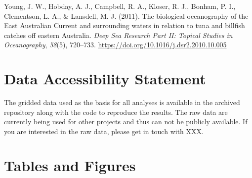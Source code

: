 \documentclass{article}
\newlength{\cslhangindent}
\newlength{\cslentryspacingunit} %
\newenvironment{CSLReferences}[2] %
 {%
  \setlength{\parindent}{0pt}
  \ifodd #1
  \let\oldpar\par
  \def\par{\hangindent=\cslhangindent\oldpar}
  \fi
  \setlength{\parskip}{#2\cslentryspacingunit}
 }%
 {}
\begin{document}
\begin{CSLReferences}{1}{0}
\leavevmode{}%
Young, J. W., Hobday, A. J., Campbell, R. A., Kloser, R. J., Bonham, P. I., Clementson, L. A., \& Lansdell, M. J. (2011). The biological oceanography of the East Australian Current and surrounding waters in relation to tuna and billfish catches off eastern Australia. \emph{Deep Sea Research Part II: Topical Studies in Oceanography}, \emph{58}(5), 720--733. \url{https://doi.org/10.1016/j.dsr2.2010.10.005}

\end{CSLReferences}

\newpage

\hypertarget{data-accessibility-statement}{%
\section*{Data Accessibility Statement}\label{data-accessibility-statement}}

The gridded data used as the basis for all analyses is available in the archived repository along with the code to reproduce the results. The raw data are currently being used for other projects and thus can not be publicly available. If you are interested in the raw data, please get in touch with XXX.

\newpage

\hypertarget{tables-and-figures}{%
\section*{Tables and Figures}\label{tables-and-figures}}
\end{document}
